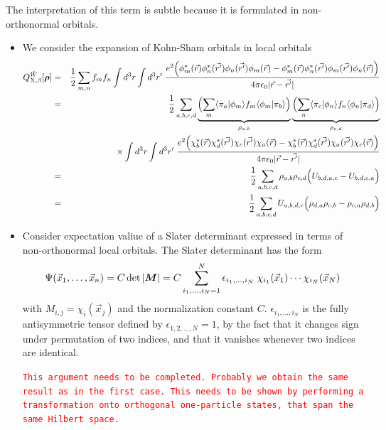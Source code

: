 \documentclass[11pt,a4paper]{report}
\newcommand{\petertt}[1]{\textcolor{red}{\texttt{#1}}}
\begin{document}
The interpretation of this term is subtle because it is formulated in
non-orthonormal orbitals. 
\begin{itemize}
\item We consider the expansion of Kohn-Sham orbitals in local orbitals
\begin{eqnarray}
Q_{\text{X},\beta}^{\hat{W}}[\bm{\rho}]
&=&\frac{1}{2}\sum_{m,n}f_mf_n\int d^3r\int d^3r'\;
\frac{e^2\Bigl(
\phi^*_m(\vec{r})\phi^*_n(\vec{r'})\phi_n(\vec{r'})\phi_m(\vec{r})
-
\phi^*_m(\vec{r})\phi^*_n(\vec{r'})\phi_m(\vec{r'})\phi_n(\vec{r})\Bigr)
}{4\pi\epsilon_0|\vec{r}-\vec{r'}|}
\nonumber\\
&=&\frac{1}{2}\sum_{a,b,c,d}
\underbrace{
\Bigl(\sum_{m}\langle\pi_a|\phi_m\rangle f_m\langle\phi_m|\pi_b\rangle\Bigr)
}_{\rho_{a,b}}
\underbrace{
\Bigl(\sum_{n}\langle\pi_c|\phi_n\rangle f_n\langle\phi_n|\pi_d\rangle\Bigr)
}_{\rho_{c,d}}
\nonumber\\
&&\times
\int d^3r\int d^3r'\;
\frac{e^2\Bigl(
\chi^*_b(\vec{r})\chi^*_d(\vec{r'})\chi_c(\vec{r'})\chi_a(\vec{r})
-
\chi^*_b(\vec{r})\chi^*_d(\vec{r'})\chi_a(\vec{r'})\chi_c(\vec{r})\Bigr)
}{4\pi\epsilon_0|\vec{r}-\vec{r'}|}
\\
&=&\frac{1}{2}\sum_{a,b,c,d}\rho_{a,b}\rho_{c,d}
\Bigl(U_{b,d,a,c}-U_{b,d,c,a}\Bigr)
\\
&=&\frac{1}{2}\sum_{a,b,c,d}
U_{a,b,d,c}\Bigl(\rho_{d,a}\rho_{c,b}-\rho_{c,a}\rho_{d,b}\Bigr)
\end{eqnarray}
%
\item Consider expectation valiue of a Slater determinant expressed in
  terms of non-orthonormal local orbitals. The Slater determinant has the form
  \begin{eqnarray}
    \Psi(\vec{x}_1,\ldots,\vec{x}_n)
    =C\det\left| \bm{M}\right|=C\sum_{i_1,\ldots,i_N=1}^N
\epsilon_{i_1,\ldots,i_N}\;   
\chi_{i_1}(\vec{x}_1)\cdots\chi_{i_N}(\vec{x}_N)
  \end{eqnarray}
 with $M_{i,j}=\chi_{i}(\vec{x}_j)$ and the normalization constant
 $C$.  $\epsilon_{i_1,\ldots,i_N}$ is the fully antisymmetric tensor
 defined by $\epsilon_{1,2,\ldots,N}=1$, by the fact that it changes
 sign under permutation of two indices, and that it vanishes whenever
 two indices are identical.

\petertt{This argument needs to be completed. Probably we obtain the
  same result as in the first case. This needs to be shown by
  performing a transformation onto orthogonal one-particle states,
  that span the same Hilbert space.}

\end{itemize}
\end{document}
